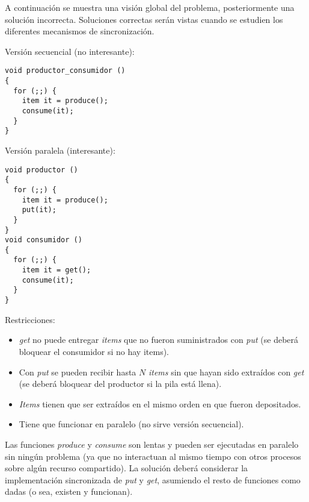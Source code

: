 A continuación se muestra una visión global del problema, posteriormente una
solución incorrecta. Soluciones correctas serán vistas cuando se estudien los
diferentes mecanismos de sincronización.

Versión secuencial (no interesante):
\begin{lstlisting}
void productor_consumidor ()
{
  for (;;) {
    item it = produce();
    consume(it);
  }
}
\end{lstlisting}

Versión paralela (interesante):
\begin{lstlisting}
void productor ()
{
  for (;;) {
    item it = produce();
    put(it);
  }
}
void consumidor ()
{
  for (;;) {
    item it = get();
    consume(it);
  }
}
\end{lstlisting}

Restricciones:
\begin{itemize}

\item \emph{get} no puede entregar \emph{items} que no fueron suministrados
con \emph{put} (se deberá bloquear el consumidor si no hay items).

\item Con \emph{put} se pueden recibir hasta $N$ \emph{items} sin que hayan
sido extraídos con \emph{get} (se deberá bloquear del productor si la pila
está llena).

\item \emph{Items} tienen que ser extraídos en el mismo orden en que fueron
depositados.

\item Tiene que funcionar en paralelo (no sirve versión secuencial).

\end{itemize}

Las funciones \emph{produce} y \emph{consume} son lentas y pueden ser
ejecutadas en paralelo sin ningún problema (ya que no interactuan al mismo
tiempo con otros procesos sobre algún recurso compartido). La solución deberá
considerar la implementación sincronizada de \emph{put} y \emph{get},
asumiendo el resto de funciones como dadas (o sea, existen y funcionan).


